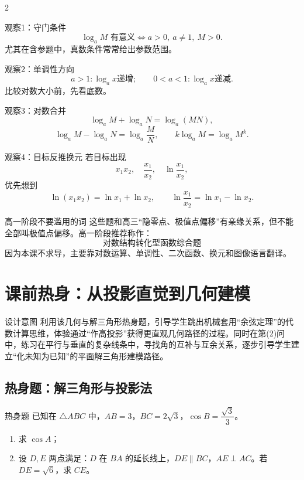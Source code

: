 \documentclass[11pt,a4paper]{ctexart}
\begin{document}
\begin{multicols}{2}
\begin{keybox}{观察1：守门条件}
\[
\log_a M \text{ 有意义}\Longleftrightarrow a>0,\ a\ne1,\ M>0.
\]
尤其在含参题中，真数条件常常给出参数范围。
\end{keybox}

\begin{keybox}{观察2：单调性方向}
\[
 a>1: \log_a x \text{递增};\qquad 0<a<1: \log_a x \text{递减}.
\]
比较对数大小前，先看底数。
\end{keybox}

\begin{keybox}{观察3：对数合并}
\[
\log_a M+\log_a N=\log_a(MN),
\]
\[
\log_a M-\log_a N=\log_a\frac{M}{N},
\qquad k\log_a M=\log_a M^k.
\]
\end{keybox}

\begin{keybox}{观察4：目标反推换元}
若目标出现
\[
x_1x_2,\quad \frac{x_1}{x_2},\quad \ln\frac{x_1}{x_2},
\]
优先想到
\[
\ln(x_1x_2)=\ln x_1+\ln x_2,
\qquad
\ln\frac{x_1}{x_2}=\ln x_1-\ln x_2.
\]
\end{keybox}
\end{multicols}

\begin{warnbox}{高一阶段不要滥用的词}
这些题和高三“隐零点、极值点偏移”有亲缘关系，但不能全部叫极值点偏移。高一阶段推荐称作：
\[
\boxed{\text{对数结构转化型函数综合题}}
\]
因为本课不求导，主要靠对数运算、单调性、二次函数、换元和图像语言翻译。
\end{warnbox}

\section{课前热身：从投影直觉到几何建模}

\begin{teachbox}{设计意图}
利用该几何与解三角形热身题，引导学生跳出机械套用“余弦定理”的代数计算思维，体验通过“作高投影”获得更直观几何路径的过程。同时在第(2)问中，练习在平行与垂直的复杂线条中，寻找角的互补与互余关系，逐步引导学生建立“化未知为已知”的平面解三角形建模路径。
\end{teachbox}

\subsection{热身题：解三角形与投影法}

\begin{exbox}{热身题}
已知在 $\triangle ABC$ 中，$AB=3$，$BC=2\sqrt3$，$\cos B=\dfrac{\sqrt3}{3}$。
\begin{enumerate}[label=(\arabic*)]
  \item 求 $\cos A$；
  \item 设 $D, E$ 两点满足：$D$ 在 $BA$ 的延长线上，$DE\parallel BC$，$AE\perp AC$。若 $DE=\sqrt6$，求 $CE$。
\end{enumerate}
\end{exbox}
\end{document}
